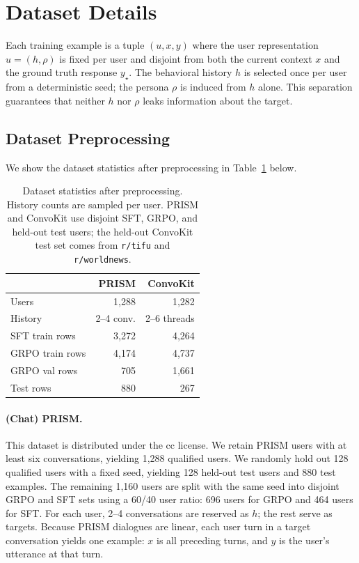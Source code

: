 \documentclass{article} %
\begin{document}
\section{Dataset Details}
\label{app:dataset-stats}

Each training example is a tuple $(u, x, y)$ where the user representation $u = (h, \rho)$ is fixed per user and disjoint from both the current context $x$ and the ground truth response $y_{\star}$. The behavioral history $h$ is selected once per user from a deterministic seed; the persona $\rho$ is induced from $h$ alone. This separation guarantees that neither $h$ nor $\rho$ leaks information about the target.

\subsection{Dataset Preprocessing}

We show the dataset statistics after preprocessing in Table~\ref{tab:preprocessing_stats} below.

\begin{table}[h]
\centering
\small
\begin{tabular}{lrr}
\toprule
 & PRISM & ConvoKit \\
\midrule
Users & 1,288 & 1,282 \\
History & 2--4 conv. & 2--6 threads \\
SFT train rows & 3,272 & 4,264 \\
GRPO train rows & 4,174 & 4,737 \\
GRPO val rows & 705 & 1,661 \\
Test rows & 880 & 267 \\
\bottomrule
\end{tabular}
\caption{Dataset statistics after preprocessing. History counts are sampled per user. PRISM and ConvoKit use disjoint SFT, GRPO, and held-out test users; the held-out ConvoKit test set comes from \texttt{r/tifu} and \texttt{r/worldnews}.}
\label{tab:preprocessing_stats}
\end{table}

\paragraph{(Chat) PRISM.}
This dataset is distributed under the cc license. We retain PRISM users with at least six conversations, yielding 1,288 qualified users. We randomly hold out 128 qualified users with a fixed seed, yielding 128 held-out test users and 880 test examples. The remaining 1,160 users are split with the same seed into disjoint GRPO and SFT sets using a 60/40 user ratio: 696 users for GRPO and 464 users for SFT. For each user, 2--4 conversations are reserved as $h$; the rest serve as targets. Because PRISM dialogues are linear, each user turn in a target conversation yields one example: $x$ is all preceding turns, and $y$ is the user's utterance at that turn.
\end{document}
